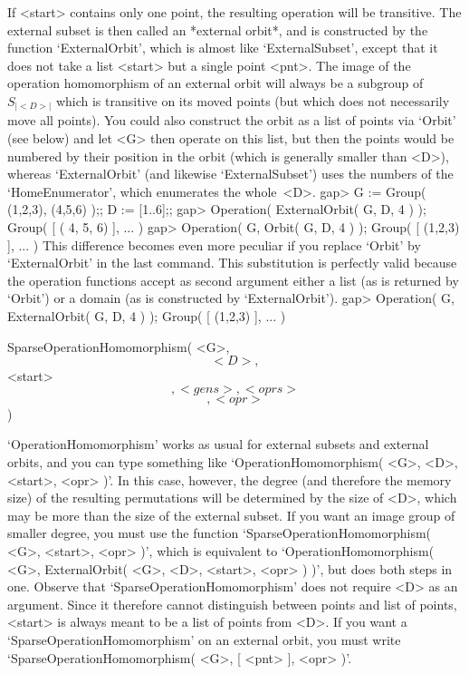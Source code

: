 If <start> contains  only one  point,   the resulting operation  will  be
transitive. The external  subset is then  called an *external orbit*, and
is  constructed by the  function  `ExternalOrbit',  which is almost  like
`ExternalSubset', except  that it  does not  take a   list <start> but  a
single point  <pnt>.  The  image of  the   operation homomorphism  of  an
external orbit   will  always be   a  subgroup of~$S_{|<D>|}$   which  is
transitive on  its moved points (but  which does not necessarily move all
points).  You could  also  construct the orbit   as a list of points  via
`Orbit' (see below) and  let <G> then operate on  this list, but then the
points  would be  numbered   by their  position in   the orbit (which  is
generally   smaller than  <D>),   whereas  `ExternalOrbit'  (and likewise
`ExternalSubset')   uses the  numbers   of  the  `HomeEnumerator',  which
enumerates the whole~<D>.
\begintt
    gap> G := Group( (1,2,3), (4,5,6) );;  D := [1..6];;
    gap> Operation( ExternalOrbit( G, D, 4 ) );
    Group( [ ( 4, 5, 6) ], ... )
    gap> Operation( G, Orbit( G, D, 4 ) );
    Group( [ (1,2,3) ], ... )
\endtt
This difference becomes   even more peculiar   if you replace  `Orbit' by
`ExternalOrbit' in the last command. This substitution is perfectly valid
because the  operation functions accept  as second argument either a list
(as is   returned  by  `Orbit') or   a   domain (as   is constructed   by
`ExternalOrbit').
\begintt
    gap> Operation( G, ExternalOrbit( G, D, 4 ) );
    Group( [ (1,2,3) ], ... )
\endtt

\>SparseOperationHomomorphism( <G>, \[ <D>, \] <start> \[, <gens>, %
                               <oprs> \] \[, <opr> \] )

`OperationHomomorphism' works as usual  for external subsets and external
orbits, and you can type something like `OperationHomomorphism( <G>, <D>,
<start>, <opr> )'.  In this case, however,  the degree (and therefore the
memory size) of the resulting permutations will be determined by the size
of <D>, which  may be more  than the size  of the external subset. If you
want an  image   group of smaller  degree, you    must use  the  function
`SparseOperationHomomorphism( <G>, <start>, <opr> )', which is equivalent
to `OperationHomomorphism( <G>, ExternalOrbit( <G>, <D>, <start>, <opr> )
)',     but   does     both      steps    in     one.     Observe    that
`SparseOperationHomomorphism' does not require <D>  as an argument. Since
it therefore cannot  distinguish  between  points  and list of    points,
<start> is always  meant to be a  list of points  from <D>. If you want a
`SparseOperationHomomorphism' on  an  external   orbit, you   must  write
`SparseOperationHomomorphism( <G>, [ <pnt> ], <opr> )'.


